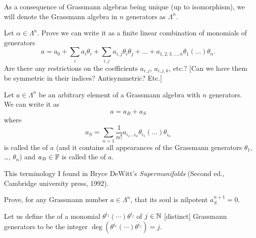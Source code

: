  As a consequence of Grassmann algebras being unique (up to
isomorphism), we will denote the Grassmann algebra in $n$ generators as $\Lambda^{n}$.

\begin{exercise}
Let $\alpha\in\Lambda^{n}$. Prove we can write it as a finite linear
combination of monomials of generators
\begin{equation}
a = a_{0} + \sum_{i}a_{i}\theta_{i} +
\sum_{i,j}a_{i,j}\theta_{i}\theta_{j} + \dots + a_{1,2,3,\dots,n}\theta_{1}(\dots)\theta_{n}.
\end{equation}
Are there any restrictions on the coefficients $a_{i,j}$, $a_{i,j,k}$,
etc.? [Can we have them be symmetric in their indices? Antisymmetric? Etc.]
\end{exercise}

\begin{definition}
Let $a\in\Lambda^{n}$ be an arbitrary element of a Grassmann algebra
with $n$ generators. We can write it as
\begin{equation}
a = a_{B} + a_{S}
\end{equation}
where
\begin{equation}
a_{S} = \sum_{n=1}\frac{1}{n!}a_{i_{1}\dots i_{n}}\theta_{i_{1}}(\dots)\theta_{i_{n}}
\end{equation}
is called the  of $a$ (and it contains all appearances of the
Grassmann generators $\theta_{1}$, \dots, $\theta_{n}$) and
$a_{B}\in\mathbb{F}$ is called the  of $a$.
\end{definition}

\begin{remark}
This terminology I found in Bryce DeWitt's \textit{Supermanifolds}
(Second ed., Cambridge university press, 1992).
\end{remark}

\begin{exercise}
Prove, for any Grassmann number $a\in\Lambda^{n}$, that its soul is nilpotent $a_{S}^{n+1}=0$.
\end{exercise}

\begin{definition}
Let us define the  of a monomial
$\theta^{i_{1}}(\cdots)\theta^{i_{j}}$ of $j\in\mathbb{N}$ [distinct] Grassmann generators
to be the integer $\deg(\theta^{i_{1}}(\cdots)\theta^{i_{j}})=j$.
\end{definition}

